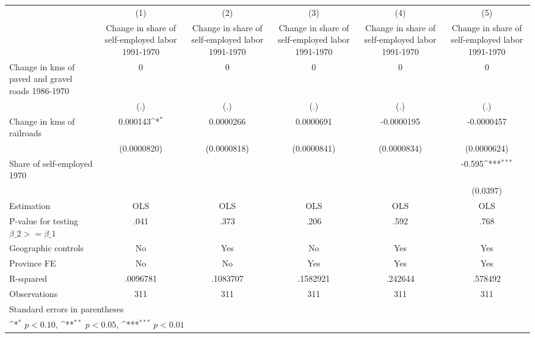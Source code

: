 {
\def\sym#1{\ifmmode^{#1}\else\(^{#1}\)\fi}
\begin{tabular}{l*{5}{c}}
\hline\hline
                    &\multicolumn{1}{c}{(1)}&\multicolumn{1}{c}{(2)}&\multicolumn{1}{c}{(3)}&\multicolumn{1}{c}{(4)}&\multicolumn{1}{c}{(5)}\\
                    &\multicolumn{1}{c}{Change in share of self-employed labor 1991-1970}&\multicolumn{1}{c}{Change in share of self-employed labor 1991-1970}&\multicolumn{1}{c}{Change in share of self-employed labor 1991-1970}&\multicolumn{1}{c}{Change in share of self-employed labor 1991-1970}&\multicolumn{1}{c}{Change in share of self-employed labor 1991-1970}\\
\hline
Change in kms of paved and gravel roads 1986-1970&           0         &           0         &           0         &           0         &           0         \\
                    &         (.)         &         (.)         &         (.)         &         (.)         &         (.)         \\
[1em]
Change in kms of railroads&    0.000143\sym{*}  &   0.0000266         &   0.0000691         &  -0.0000195         &  -0.0000457         \\
                    & (0.0000820)         & (0.0000818)         & (0.0000841)         & (0.0000834)         & (0.0000624)         \\
[1em]
Share of self-employed 1970&                     &                     &                     &                     &      -0.595\sym{***}\\
                    &                     &                     &                     &                     &    (0.0397)         \\
\hline
Estimation          &         OLS         &         OLS         &         OLS         &         OLS         &         OLS         \\
P-value for testing $\beta\_2 >= \beta\_1$&        .041         &        .373         &        .206         &        .592         &        .768         \\
Geographic controls &          No         &         Yes         &          No         &         Yes         &         Yes         \\
Province FE         &          No         &          No         &         Yes         &         Yes         &         Yes         \\
R-squared           &    .0096781         &    .1083707         &    .1582921         &     .242644         &     .578492         \\
Observations        &         311         &         311         &         311         &         311         &         311         \\
\hline\hline
\multicolumn{6}{l}{\footnotesize Standard errors in parentheses}\\
\multicolumn{6}{l}{\footnotesize \sym{*} \(p<0.10\), \sym{**} \(p<0.05\), \sym{***} \(p<0.01\)}\\
\end{tabular}
}
